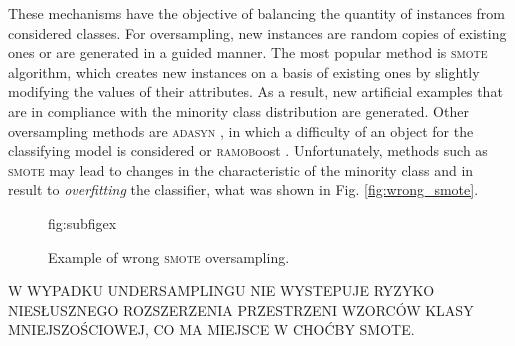 \documentclass[pmlr]{jmlr}
\begin{document}
These mechanisms have the objective of balancing the quantity of instances from considered classes. For oversampling, new instances are random copies of existing ones or are generated in a guided manner. The most popular method is \textsc{smote} \cite{Cha2002} algorithm, which creates new instances on a basis of existing ones by slightly modifying the values of their attributes. As a result, new artificial examples that are in compliance with the minority class distribution are generated.  Other oversampling methods are \textsc{adasyn} \cite{He:2008}, in which a difficulty of an object for the classifying model is considered or \textsc{ramob}oost \cite{Chen:2010}. Unfortunately, methods such as \textsc{smote} may lead to changes in the characteristic of the minority class and in result to \emph{overfitting} the classifier, what was shown in Fig. \ref{fig:wrong_smote}.

\begin{figure}[htbp]
\floatconts
  {fig:subfigex}
  {\caption{Example of wrong \textsc{smote} oversampling.}}
  {%
    \qquad
  }
\end{figure}

W WYPADKU UNDERSAMPLINGU NIE WYSTEPUJE RYZYKO NIESŁUSZNEGO ROZSZERZENIA PRZESTRZENI WZORCÓW KLASY MNIEJSZOŚCIOWEJ, CO MA MIEJSCE W CHOĆBY SMOTE.
\end{document}
